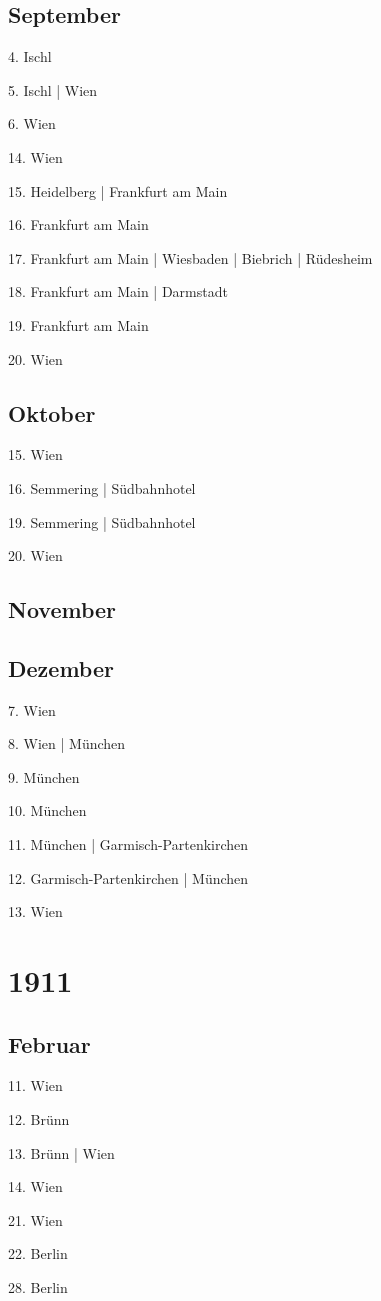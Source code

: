 \documentclass[twoside=false,titlepage=false,open=any, parskip=never, fontsize=10pt, headings=small, chapterprefix=false, appendixprefix=false, DIV=15]{scrbook}
\begin{document}
\begin{multicols}{3}
            \section*{September}
            4. Ischl\par
            5. Ischl | Wien\par
            6. Wien\par
            14. Wien\par
            15. Heidelberg | Frankfurt am Main\par
            16. Frankfurt am Main\par
            17. Frankfurt am Main | Wiesbaden | Biebrich | Rüdesheim\par
            18. Frankfurt am Main | Darmstadt\par
            19. Frankfurt am Main\par
            20. Wien\par
            \section*{Oktober}
            15. Wien\par
            16. Semmering | Südbahnhotel\par
            19. Semmering | Südbahnhotel\par
            20. Wien\par
            \section*{November}
            \section*{Dezember}
            7. Wien\par
            8. Wien | München\par
            9. München\par
            10. München\par
            11. München | Garmisch-Partenkirchen\par
            12. Garmisch-Partenkirchen | München\par
            13. Wien\par
            \chapter*{1911}
            \section*{Februar}
            11. Wien\par
            12. Brünn\par
            13. Brünn | Wien\par
            14. Wien\par
            21. Wien\par
            22. Berlin\par
            28. Berlin\par

\end{multicols}
\end{document}
